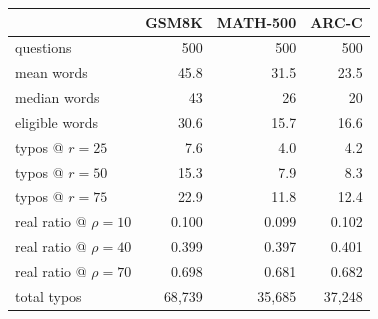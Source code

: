 \begin{tabular}{lrrr}
\toprule
 & GSM8K & MATH-500 & ARC-C \\
\midrule
questions & 500 & 500 & 500 \\
mean words & 45.8 & 31.5 & 23.5 \\
median words & 43 & 26 & 20 \\
eligible words & 30.6 & 15.7 & 16.6 \\
\midrule
typos @ $r{=}25$ & 7.6 & 4.0 & 4.2 \\
typos @ $r{=}50$ & 15.3 & 7.9 & 8.3 \\
typos @ $r{=}75$ & 22.9 & 11.8 & 12.4 \\
\midrule
real ratio @ $\rho{=}10$ & 0.100 & 0.099 & 0.102 \\
real ratio @ $\rho{=}40$ & 0.399 & 0.397 & 0.401 \\
real ratio @ $\rho{=}70$ & 0.698 & 0.681 & 0.682 \\
\midrule
total typos & 68{,}739 & 35{,}685 & 37{,}248 \\
\bottomrule
\end{tabular}
